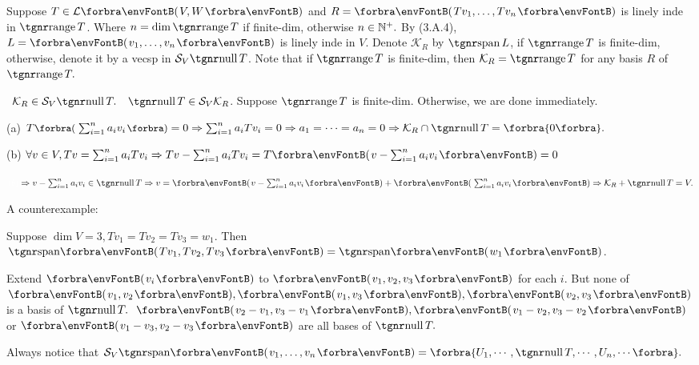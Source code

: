 \BulletPointX\NewNotation\TextB{}
Suppose $T\in\Lm{V,W}$ and $R=\Par{Tv_1,\dots,Tv_n}$ is linely inde in $\range T$.\TextB{}
Where $n=\dim\range T$ if finite-dim, otherwise $n\in{\mathbb{N}^+}.$\TextB{}
By (3.A.4), $L=\Par{v_1,\dots,v_n}$ is linely inde in $V$.\TextB{}
Denote $\mathcal{K}_R$ by $\Spn L$, if $\range T$ is finite-dim, otherwise, denote it by a vecsp in $\mathcal{S}_V\null T$.\TextB{}
Note that if $\range T$ is finite-dim, then $\mathcal{K}_R=\range T$ for any basis $R$ of $\range T.$\par\vspace{6pt}
\BulletPointX\NewTheorem\,\,\,{\Large$\mathcal{K}_R\in\mathcal{S}_V\null T.$} \qquad\Comment\,\,\,$\null T\in\mathcal{S}_V \mathcal{K}_R$.\TextB{}
Suppose $\range T$ is finite-dim. Otherwise, we are done immediately.\par\vspace{6pt}\TextB{}
(a) $T\BigPar{\sum_{i=1}^n a_i v_i}=0\Rightarrow \sum_{i=1}^n a_i Tv_i=0\Rightarrow a_1=\dots=a_n=0\Rightarrow\mathcal{K}_R\cap\null T=\zeroSubs.$\par\vspace{6pt}\TextB{}
(b) $\forall v\in V, Tv=\sum_{i=1}^n a_i Tv_i\Rightarrow Tv-\sum_{i=1}^n a_i Tv_i=T\Par{v-\sum_{i=1}^n a_i v_i}=0$\par\vspace{6pt}\TextB{}
$\Hb\Rightarrow v-\sum_{i=1}^n a_i v_i\in\null T\Rightarrow v=\Par{v-\sum_{i=1}^n a_i v_i}+\Par{\sum_{i=1}^n a_i v_i}\Rightarrow\mathcal{K}_R+\null T=V.$\PfEnd
\SepLine

A counterexample:\par\quad
Suppose $\dim V=3, Tv_1=Tv_2=Tv_3=w_1.$ Then $\Span{Tv_1,Tv_2,Tv_3}=\Span{w_1}$.\par\quad
Extend $\Par{v_i}$ to $\Par{v_1,v_2,v_3}$ for each $i$. But none of $\Par{v_1,v_2},\Par{v_1,v_3},\Par{v_2,v_3}$ is a basis of $\null T.$\PfEnd[-15pt]
\Comment \,\,\,$\Par{v_2-v_1,v_3-v_1},\Par{v_1-v_2,v_3-v_2}$ or $\Par{v_1-v_3,v_2-v_3}$ are all bases of $\null T.$\par\Blind{\Comment\,\,}
Always notice that $\mathcal{S}_V\Span{v_1,\dots,v_n}=\Bra{U_1,\cdots,\null T,\cdots,U_n,\cdots}.$\par
\SepLine

